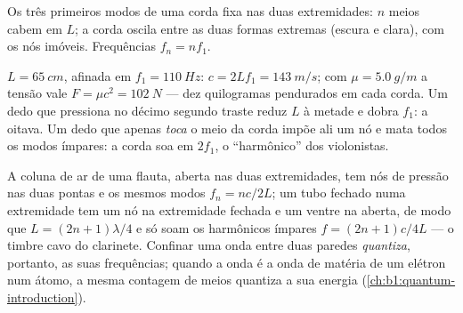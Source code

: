 \begin{omfigure}

{\small Os três primeiros modos de uma corda fixa nas duas extremidades: $n$
meios  cabem em $L$; a corda oscila entre as duas formas
extremas (escura e clara), com os nós imóveis. Frequências $f_n = nf_1$.}
\end{omfigure}

\begin{example}\label{ex:b1:wave-propagation:guitar}
$L = \qty{65}{cm}$, afinada em $f_1 = \qty{110}{Hz}$: $c = 2Lf_1 =
\qty{143}{m/s}$; com $\mu = \qty{5.0}{g/m}$ a tensão vale $F = \mu c^2
= \qty{102}{N}$ --- dez quilogramas pendurados em cada corda. Um dedo
que pressiona no décimo segundo traste reduz $L$ à metade e dobra $f_1$: a oitava.
Um dedo que apenas \emph{toca} o meio da corda impõe ali um nó e
mata todos os modos ímpares: a corda soa em $2f_1$, o ``harmônico'' dos
violonistas.
\end{example}

\begin{remark}\label{rem:b1:wave-propagation:pipes}
A coluna de ar de uma flauta, aberta nas duas extremidades, tem nós de pressão nas
duas pontas e os mesmos modos $f_n = nc/2L$; um tubo fechado numa extremidade
tem um nó na extremidade fechada e um ventre na aberta, de modo que
$L = (2n + 1)\lambda/4$ e só soam os harmônicos ímpares $f = (2n + 1)c/4L$
--- o timbre cavo do clarinete. Confinar uma onda entre duas
paredes \emph{quantiza}, portanto, as suas frequências; quando a onda é a onda
de matéria de um elétron num átomo, a mesma contagem de meios 
quantiza a sua energia (\cref{ch:b1:quantum-introduction}).
\end{remark}

